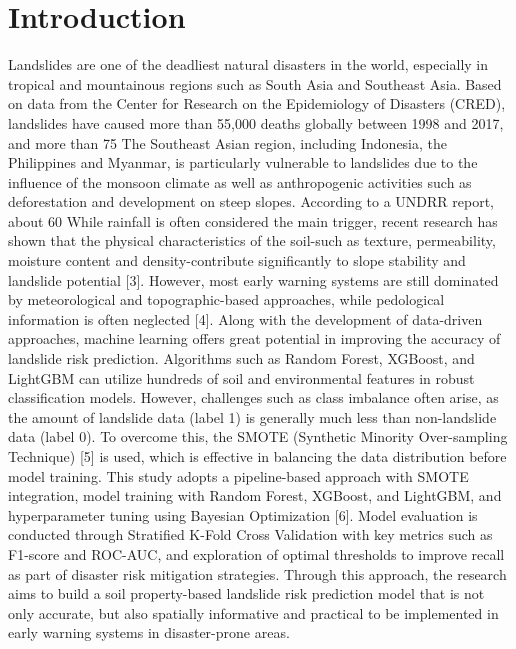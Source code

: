 \section{Introduction}
Landslides are one of the deadliest natural disasters in the world, especially in tropical and mountainous regions such as South Asia and Southeast Asia. Based on data from the Center for Research on the Epidemiology of Disasters (CRED), landslides have caused more than 55,000 deaths globally between 1998 and 2017, and more than 75%
The Southeast Asian region, including Indonesia, the Philippines and Myanmar, is particularly vulnerable to landslides due to the influence of the monsoon climate as well as anthropogenic activities such as deforestation and development on steep slopes. According to a UNDRR report, about 60%
While rainfall is often considered the main trigger, recent research has shown that the physical characteristics of the soil-such as texture, permeability, moisture content and density-contribute significantly to slope stability and landslide potential [3]. However, most early warning systems are still dominated by meteorological and topographic-based approaches, while pedological information is often neglected [4].
Along with the development of data-driven approaches, machine learning offers great potential in improving the accuracy of landslide risk prediction. Algorithms such as Random Forest, XGBoost, and LightGBM can utilize hundreds of soil and environmental features in robust classification models. However, challenges such as class imbalance often arise, as the amount of landslide data (label 1) is generally much less than non-landslide data (label 0). To overcome this, the SMOTE (Synthetic Minority Over-sampling Technique) [5] is used, which is effective in balancing the data distribution before model training.
This study adopts a pipeline-based approach with SMOTE integration, model training with Random Forest, XGBoost, and LightGBM, and hyperparameter tuning using Bayesian Optimization [6]. Model evaluation is conducted through Stratified K-Fold Cross Validation with key metrics such as F1-score and ROC-AUC, and exploration of optimal thresholds to improve recall as part of disaster risk mitigation strategies.
Through this approach, the research aims to build a soil property-based landslide risk prediction model that is not only accurate, but also spatially informative and practical to be implemented in early warning systems in disaster-prone areas.